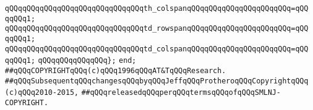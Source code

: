 \verb|qQQqqQQqqQQqqQQqqQQqqQQqqQQqqQQqth_colspanqQQqqQQqqQQqqQQqqQQqqQQq=qQQqqQQq1;|\newline
\verb|qQQqqQQqqQQqqQQqqQQqqQQqqQQqqQQqtd_rowspanqQQqqQQqqQQqqQQqqQQqqQQq=qQQqqQQq1;|\newline
\verb|qQQqqQQqqQQqqQQqqQQqqQQqqQQqqQQqtd_colspanqQQqqQQqqQQqqQQqqQQqqQQq=qQQqqQQq1;|\newline
\verb|qQQqqQQqqQQqqQQq};|\newline
\verb|end;|\newline
\newline
\newline
\verb|##qQQqCOPYRIGHTqQQq(c)qQQq1996qQQqAT&TqQQqResearch.|\newline
\verb|##qQQqSubsequentqQQqchangesqQQqbyqQQqJeffqQQqProtheroqQQqCopyrightqQQq(c)qQQq2010-2015,|\newline
\verb|##qQQqreleasedqQQqperqQQqtermsqQQqofqQQqSMLNJ-COPYRIGHT.|\newline

